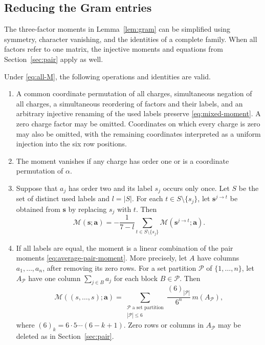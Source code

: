 \subsection{Reducing the Gram entries}

The three-factor moments in Lemma~\ref{lem:gram} can be simplified using
symmetry, character vanishing, and the identities of a complete family.
When all factors refer to one matrix, the injective moments and equations
from Section~\ref{sec:pair} apply as well.

\begin{lemma}\label{lem:mixed-reductions}
Under \eqref{eq:all-M}, the following operations and identities are valid.
\begin{enumerate}[label=\textup{(\roman*)}]
 \item A common coordinate permutation of all charges, simultaneous
 negation of all charges, a simultaneous reordering of factors and their
 labels, and an arbitrary injective renaming of the used labels preserve
 \eqref{eq:mixed-moment}. A zero charge factor may be omitted. Coordinates
 on which every charge is zero may also be omitted, with the remaining
 coordinates interpreted as a uniform injection into the six row positions.

 \item The moment vanishes if any charge has order one or is a coordinate
 permutation of $\alpha$.

 \item Suppose that $a_j$ has order two and its label $s_j$ occurs only
 once. Let $S$ be the set of distinct used labels and $l=|S|$. For each
 $t\in S\setminus\{s_j\}$, let $\mathbf s^{j\to t}$ be obtained from
 $\mathbf s$ by replacing $s_j$ with $t$. Then
 \begin{equation}\label{eq:singleton-reduction}
 \mathcal M(\mathbf s;\mathbf a)
 =-\frac1{7-l}\sum_{t\in S\setminus\{s_j\}}
       \mathcal M(\mathbf s^{j\to t};\mathbf a).
 \end{equation}

 \item If all labels are equal, the moment is a linear combination of
 the pair moments \eqref{eq:average-pair-moment}. More precisely, let
 $A$ have columns $a_1,\ldots,a_n$, after removing its zero rows. For a
 set partition $\mathcal P$ of $\{1,\ldots,n\}$, let $A_{\mathcal P}$
 have one column $\sum_{j\in B}a_j$ for each block $B\in\mathcal P$.
 Then
 \begin{equation}\label{eq:single-label-partitions}
 \mathcal M((s,\ldots,s);\mathbf a)
 =\sum_{\substack{\mathcal P\text{ a set partition}\\|\mathcal P|\le6}}
       \frac{(6)_{|\mathcal P|}}{6^n}\,m(A_{\mathcal P}),
 \end{equation}
 where $(6)_k=6\cdot5\cdots(6-k+1)$. Zero rows or columns in
 $A_{\mathcal P}$ may be deleted as in Section~\ref{sec:pair}.


\end{enumerate}
\end{lemma}
